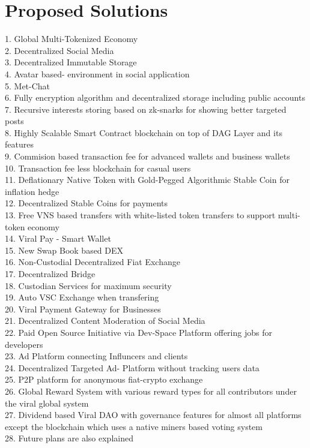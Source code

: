 \documentclass[conference]{IEEEtran}
\begin{document}
\section{\textbf{Proposed Solutions}}
1. Global Multi-Tokenized Economy\\
2. Decentralized Social Media\\
3. Decentralized Immutable Storage\\
4. Avatar based- environment in social application\\
5. Met-Chat \\
6. Fully encryption algorithm and decentralized storage including public accounts\\
7. Recursive interests storing based on zk-snarks for showing better targeted posts\\
8. Highly Scalable Smart Contract blockchain on top of DAG Layer and its features\\
9. Commision based transaction fee for advanced wallets and business wallets\\
10. Transaction fee less blockchain for casual users\\
11. Deflationary Native Token with Gold-Pegged Algorithmic Stable Coin for inflation hedge\\
12. Decentralized Stable Coins for payments\\
13. Free VNS based transfers with white-listed token transfers to support multi-token economy\\
14. Viral Pay - Smart Wallet\\
15. New Swap Book based DEX\\
16. Non-Custodial Decentralized Fiat Exchange\\
17. Decentralized Bridge\\
18. Custodian Services for maximum security\\
19. Auto VSC Exchange when transfering\\
20. Viral Payment Gateway for Businesses\\
21. Decentralized Content Moderation of Social Media\\
22. Paid Open Source Initiative via Dev-Space Platform offering jobs for developers\\
23. Ad Platform connecting Influncers and clients\\
24. Decentralized Targeted Ad- Platform without tracking users data\\
25. P2P platform for anonymous fiat-crypto exchange\\
26. Global Reward System with various reward types for all contributors under the viral global system\\
27. Dividend based Viral DAO with governance features for almost all platforms except the blockchain which uses a native miners based voting system\\
28. Future plans are also explained\\
\end{document}

